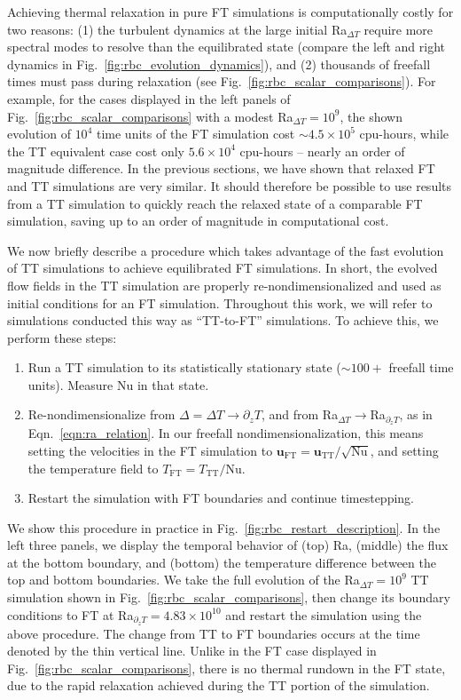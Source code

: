 \documentclass[aps, pre, onecolumn, nofootinbib, notitlepage, groupedaddress, amsfonts, amssymb, amsmath, longbibliography, superscriptaddress]{revtex4-1}
\begin{document}
Achieving thermal relaxation in pure FT simulations is computationally costly for two reasons: (1) the turbulent dynamics at the large initial Ra$_{\Delta T}$ require more spectral modes to resolve than the equilibrated state (compare the left and right dynamics in Fig.~\ref{fig:rbc_evolution_dynamics}), and (2) thousands of freefall times must pass during relaxation (see Fig.~\ref{fig:rbc_scalar_comparisons}).
For example, for the cases displayed in the left panels of Fig.~\ref{fig:rbc_scalar_comparisons} with a modest Ra$_{\Delta T} = 10^9$, the shown evolution of $10^4$ time units of the FT simulation cost $\sim 4.5 \times 10^5$ cpu-hours, while the TT equivalent case cost only $5.6 \times 10^4$ cpu-hours -- nearly an order of magnitude difference.
In the previous sections, we have shown that relaxed FT and TT simulations are very similar.
It should therefore be possible to use results from a TT simulation to quickly reach the relaxed state of a comparable FT simulation, saving up to an order of magnitude in computational cost.

We now briefly describe a procedure which takes advantage of the fast evolution of TT simulations to achieve equilibrated FT simulations.
In short, the evolved flow fields in the TT simulation are properly re-nondimensionalized and used as initial conditions for an FT simulation.
Throughout this work, we will refer to simulations conducted this way as ``TT-to-FT'' simulations.
To achieve this, we perform these steps:
\begin{enumerate}
\item Run a TT simulation to its statistically stationary state ($\sim100+$ freefall time units). 
Measure $\text{Nu}$ in that state.
\item Re-nondimensionalize from $\Delta = \Delta T \rightarrow \partial_z T$, and from Ra$_{\Delta T}\rightarrow$Ra$_{\partial_z T}$, as in Eqn.~\ref{eqn:ra_relation}.
In our freefall nondimensionalization, this means setting the velocities in the FT simulation to $\bm{u}_{\text{FT}} = \bm{u}_{\text{TT}} / \sqrt{\text{Nu}}$, and setting the temperature field to $T_{\text{FT}} = T_{\text{TT}} / \text{Nu}$.
\item Restart the simulation with FT boundaries and continue timestepping.
\end{enumerate}
We show this procedure in practice in Fig.~\ref{fig:rbc_restart_description}.
In the left three panels, we display the temporal behavior of (top) Ra, (middle) the flux at the bottom boundary, and (bottom) the temperature difference between the top and bottom boundaries.
We take the full evolution of the Ra$_{\Delta T} = 10^9$ TT simulation shown in Fig.~\ref{fig:rbc_scalar_comparisons}, then change its boundary conditions to FT at Ra$_{\partial_z T} = 4.83\times 10^{10}$ and restart the simulation using the above procedure.
The change from TT to FT boundaries occurs at the time denoted by the thin vertical line.
Unlike in the FT case displayed in Fig.~\ref{fig:rbc_scalar_comparisons}, there is no thermal rundown in the FT state, due to the rapid relaxation achieved during the TT portion of the simulation.
\end{document}
